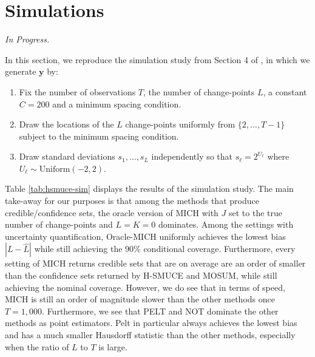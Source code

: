 \section{Simulations}
\label{sec:simulations}

\textit{In Progress.}

In this section, we reproduce the simulation study from Section 4 of \cite{Pein17}, in which we generate $\mathbf{y}$ by:
\begin{enumerate}
    \item Fix the number of observations $T$, the number of change-points $L$, a constant $C=200$ and a minimum spacing condition.
    \item Draw the locations of the $L$ change-points uniformly from $\{2, \ldots, T-1\}$ subject to the minimum spacing condition. 
    \item Draw standard deviations $s_1, \ldots, s_L$ independently so that $s_\ell = 2^{U_\ell}$ where $U_\ell \sim \text{Uniform}(-2,2)$.
\end{enumerate}



Table \ref{tab:hsmuce-sim} displays the results of the simulation study. The main take-away for our purposes is that among the methods that produce credible/confidence sets, the oracle version of MICH with $J$ set to the true number of change-points and $L=K=0$ dominates. Among the settings with uncertainty quantification, Oracle-MICH uniformly achieves the lowest bias $|L -\hat{L}|$ while still achieving the 90\% conditional coverage. Furthermore, every setting of MICH returns credible sets that are on average are an order of smaller than the confidence sets returned by H-SMUCE and MOSUM, while still achieving the nominal coverage. However, we do see that in terms of speed, MICH is still an order of magnitude slower than the other methods once $T = 1,000$. Furthermore, we see that PELT and NOT dominate the other methods as point estimators. Pelt in particular always achieves the lowest bias and has a much smaller Hausdorff statistic than the other methods, especially when the ratio of $L$ to $T$ is large. 